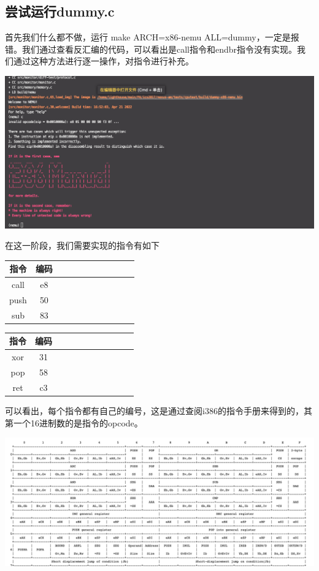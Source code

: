 \documentclass[UTF8,a4paper,10pt]{ctexart}
\begin{document}
\subsection{尝试运行dummy.c}
首先我们什么都不做，运行 make ARCH=x86-nemu ALL=dummy，一定是报错。我们通过查看反汇编的代码，可以看出是call指令和endbr指令没有实现。我们通过这种方法进行逐一操作，对指令进行补充。
\begin{center}
  \includegraphics*[scale = 0.3]{1.png}
\end{center}

在这一阶段，我们需要实现的指令有如下
\begin{table}[!htbp]
  \centering
  \begin{tabular}{ccccccccccc}
  \toprule  
  指令& 编码\\
  \midrule
  call& e8\\
  push& 50\\
  sub&  83\\
  \bottomrule
  \end{tabular}
  \begin{tabular}{ccccccccccc}
    \toprule  
    指令& 编码\\
    \midrule
    xor& 31\\
    pop& 58\\
    ret& c3\\
    \bottomrule
    \end{tabular}
\end{table}

可以看出，每个指令都有自己的编号，这是通过查阅i386的指令手册来得到的，其第一个16进制数的是指令的opcode。
\begin{center}
  \includegraphics*[scale = 0.35]{2.png}
\end{center}
\end{document}
